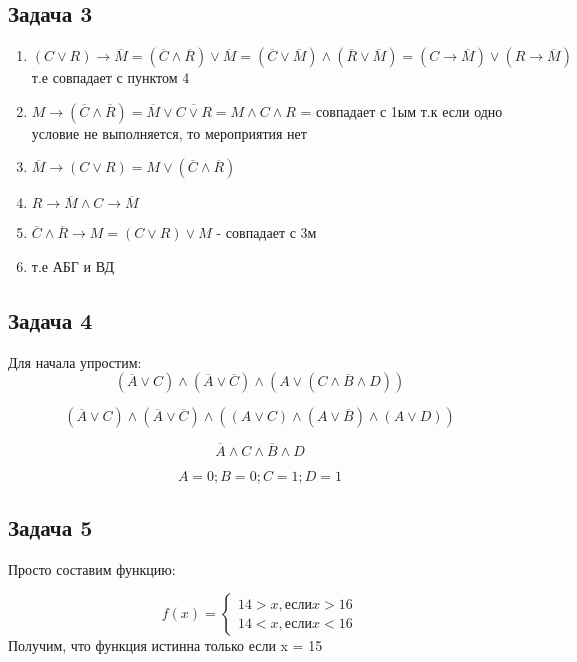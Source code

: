 \documentclass[a4paper,12pt]{article}
\begin{document}
\subsection{Задача 3}
\begin{enumerate}
    \item $(C\lor R) \to \overline{M} = (\overline{C}\land \overline{R}) \lor \overline{M} = (\overline{C}\lor \overline{M}) \land (\overline{R} \lor \overline{M}) = (C \to \overline{M}) \lor (R \to \overline{M})$ т.е совпадает с пунктом 4
    \item $M \to (\overline{C} \land \overline{R}) = \overline{M}\lor\overline{C\lor R} = M \land C \land R$ = совпадает с 1ым т.к если одно условие не выполняется, то мероприятия нет
    \item $\overline{M} \to (C \lor R) = M \lor (\overline{C}\land\overline{R})$
    \item $R \to \overline{M} \land C \to \overline{M}$
    \item $\overline{C} \land \overline{R} \to M = (C \lor R) \lor M$ - совпадает с 3м
    \item т.е АБГ и ВД
\end{enumerate}

\subsection{Задача 4}
Для начала упростим:
\[
(\overline{A} \lor C) \land (\overline{A} \lor \overline{C}) \land (A\lor (C \land \overline{B} \land D))
\]

\[
(\overline{A} \lor C) \land (\overline{A} \lor \overline{C}) \land ((A\lor C) \land (A \lor \overline{B}) \land (A \lor D))
\]

\[
\overline{A} \land C \land \overline{B} \land D
\]


\[
A = 0; B = 0; C = 1; D = 1
\]

\subsection{Задача 5}
Просто составим функцию: 

\[ f(x) = 
\begin{cases}
    14 > x, \text{если} x > 16\\
    14 < x, \text{если} x < 16
\end{cases}
\]
Получим, что функция истинна только если x = 15
\end{document}
